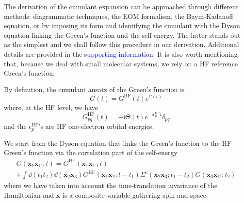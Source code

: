 \documentclass[aip,jcp,reprint,noshowkeys,superscriptaddress]{revtex4-2}
\newcommand{\HF}{\text{HF}}
\newcommand{\co}{\text{c}}
\newcommand{\bx}{\boldsymbol{x}}
\newcommand{\eps}{\epsilon}
\newcommand{\Sig}{\Sigma}
\newcommand{\ii}{\mathrm{i}}
\newcommand{\SupMat}{\textcolor{blue}{supporting information}\xspace}
\begin{document}
The derivation of the cumulant expansion can be approached through different methods: diagrammatic techniques, \cite{Nozieres_1969,Hedin_1980} the EOM formalism, \cite{Almbladh_1983} the Baym-Kadanoff equation, \cite{Guzzo_2011} or by imposing its form and identifying the cumulant with the Dyson equation linking the Green's function and the self-energy. \cite{Gunnarsson_1994,Aryasetiawan_1996} The latter stands out as the simplest and we shall follow this procedure in our derivation. 
Additional details are provided in the \SupMat. It is also worth mentioning that, because we deal with small molecular systems, we rely on a HF reference Green's function. 

By definition, the cumulant ansatz of the Green's function is
\begin{equation} \label{eq:G}
	G(t)  = G^\HF(t) e^{C(t)}
\end{equation}
where, at the HF level, we have
\begin{equation} \label{eq:Gpq_HF}
	G_{pq}^\HF(t) = - \ii \Theta(t) e^{-\ii \eps_p^\HF t} \delta_{pq}
\end{equation}
and the $\eps^\HF_p$'s are HF one-electron orbital energies.

We start from the Dyson equation that links the Green's function to the HF Green's function via the correlation part of the self-energy
\begin{multline} \label{eq:Dyson_t}
  G(\bx_1\bx_{1'};t) = G^\HF(\bx_1\bx_{1'};t) \\
  + \int \dd{(t_1t_2)} \dd{(\bx_2\bx_3)} G^\HF(\bx_1\bx_{2};t-t_1) \Sig^\co(\bx_2\bx_{3};t_1-t_2) G(\bx_3\bx_{1'};t_2)
\end{multline}
where we have taken into account the time-translation invariance of the Hamiltonian and $\bx$ is a composite variable gathering spin and space.
\end{document}

